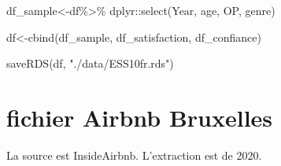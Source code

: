 \documentclass[
]{book}
\newenvironment{Shaded}{\begin{snugshade}}{\end{snugshade}}
\newcommand{\FunctionTok}[1]{\textcolor[rgb]{0.00,0.00,0.00}{#1}}
\newcommand{\NormalTok}[1]{#1}
\newcommand{\OtherTok}[1]{\textcolor[rgb]{0.56,0.35,0.01}{#1}}
\newcommand{\SpecialCharTok}[1]{\textcolor[rgb]{0.00,0.00,0.00}{#1}}
\newcommand{\StringTok}[1]{\textcolor[rgb]{0.31,0.60,0.02}{#1}}
\begin{document}
\begin{Shaded}
\begin{Highlighting}[]
\NormalTok{df\_sample}\OtherTok{\textless{}{-}}\NormalTok{df}\SpecialCharTok{\%\textgreater{}\%}
\NormalTok{  dplyr}\SpecialCharTok{::}\FunctionTok{select}\NormalTok{(Year, age, OP, genre)}


\NormalTok{df}\OtherTok{\textless{}{-}}\FunctionTok{cbind}\NormalTok{(df\_sample, df\_satisfaction, df\_confiance)}

\FunctionTok{saveRDS}\NormalTok{(df, }\StringTok{"./data/ESS10fr.rds"}\NormalTok{)}
\end{Highlighting}
\end{Shaded}

\hypertarget{fichier-airbnb-bruxelles}{%
\section{fichier Airbnb Bruxelles}\label{fichier-airbnb-bruxelles}}

La source est InsideAirbnb. L'extraction est de 2020.

\hypertarget{section}{%
\section{}\label{section}}

  
\end{document}

